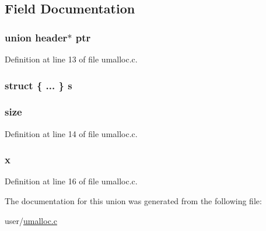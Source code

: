 \subsection{Field Documentation}
\hypertarget{unionheader_a0e84d7fb56aa45d0a3eb7083a5ff1b63}{
\subsubsection[{ptr}]{\setlength{\rightskip}{0pt plus 5cm}union {\bf header}$\ast$ ptr}}\label{unionheader_a0e84d7fb56aa45d0a3eb7083a5ff1b63}


Definition at line 13 of file umalloc.\-c.

\hypertarget{unionheader_a1e57a8830c353d3a6cd627503cb18986}{
\subsubsection[{s}]{\setlength{\rightskip}{0pt plus 5cm}struct \{ ... \}   s}}\label{unionheader_a1e57a8830c353d3a6cd627503cb18986}
\hypertarget{unionheader_a22d26304a3b3aca97e6311f6939dd1bf}{
\subsubsection[{size}]{ size}}\label{unionheader_a22d26304a3b3aca97e6311f6939dd1bf}


Definition at line 14 of file umalloc.\-c.

\hypertarget{unionheader_a5f369a9edd645986a45d0c159773c740}{
\subsubsection[{x}]{ x}}\label{unionheader_a5f369a9edd645986a45d0c159773c740}


Definition at line 16 of file umalloc.\-c.



The documentation for this union was generated from the following file\-:\begin{DoxyCompactItemize}
\item 
user/\hyperlink{umalloc_8c}{umalloc.\-c}\end{DoxyCompactItemize}
